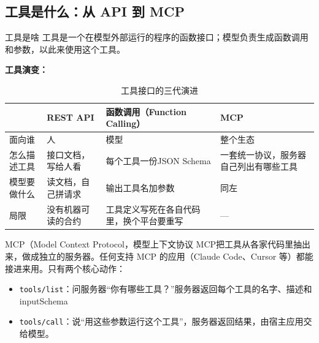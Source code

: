 \subsection{工具是什么：从 API 到 MCP}
\begin{definition}{工具是啥}
   工具是一个在模型外部运行的程序的函数接口；模型负责生成函数调用和参数，以此来使用这个工具。 
\end{definition}
\textbf{工具演变：}
\begin{table}[H]
\centering
\caption{工具接口的三代演进}

\label{tab:tool-interfaces}
\begin{tabular}{p{2.6cm} p{3.6cm} p{4.2cm} p{4.2cm}}
  \toprule
   & REST API & 函数调用（Function Calling） & MCP \\
  \midrule
  面向谁       & 人 & 模型 & 整个生态 \\
  怎么描述工具 & 接口文档，写给人看 & 每个工具一份JSON Schema & 一套统一协议，服务器自己列出有哪些工具 \\
  模型要做什么 & 读文档，自己拼请求 & 输出工具名加参数 & 同左 \\
  局限         & 没有机器可读的合约 & 工具定义写死在各自代码里，换个平台要重写 & — \\
  \bottomrule
\end{tabular}
\end{table}
\begin{definition}{MCP（Model Context Protocol，模型上下文协议}
    MCP把工具从各家代码里抽出来，做成独立的服务器。任何支持 MCP 的应用（Claude Code、Cursor 等）都能接进来用。只有两个核心动作：
    \begin{itemize}
      \item \texttt{tools/list}：问服务器“你有哪些工具？”服务器返回每个工具的名字、描述和 inputSchema
      \item \texttt{tools/call}：说“用这些参数运行这个工具”，服务器返回结果，由宿主应用交给模型。
    \end{itemize}
\end{definition}

